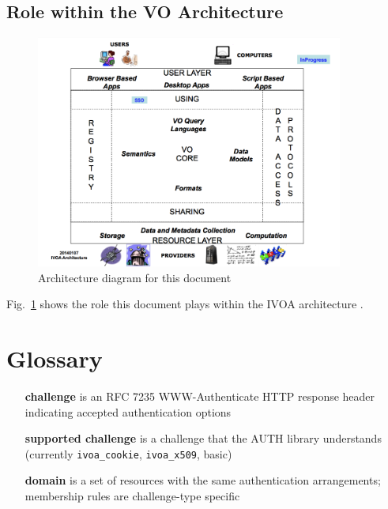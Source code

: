 \documentclass[11pt,a4paper]{ivoa}
\begin{document}
\subsection{Role within the VO Architecture}

\begin{figure}
\centering

\includegraphics[width=0.9\textwidth]{IVOA-IAM_image001.png}
\caption{Architecture diagram for this document}
\label{fig:archdiag}
\end{figure}

Fig.~\ref{fig:archdiag} shows the role this document plays within the
IVOA architecture \citep{2010ivoa.rept.1123A}.

\section{Glossary}
\begin{itemize}
  \item[{\bf challenge}] is an RFC 7235 WWW-Authenticate HTTP 
  response header indicating accepted authentication options
  \item[{\bf supported challenge}] is a challenge that the AUTH 
  library understands (currently \texttt{ivoa\_cookie}, 
  \texttt{ivoa\_x509}, basic)
  \item[{\bf domain}] is a set of resources with the same 
  authentication arrangements; membership rules are challenge-type 
  specific
\end{itemize}
\end{document}
